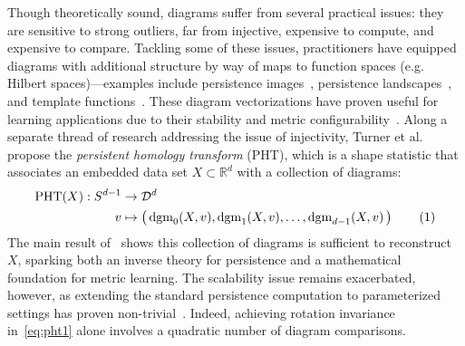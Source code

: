 \documentclass[10pt]{article}
\numberwithin{equation}{section}
\newcommand{\+}{%
	\raisebox{0.18ex}{\scaleobj{0.55}{+}}
}
\theoremstyle{definition}
\theoremstyle{definition}
\newcommand\numberthis{\addtocounter{equation}{1}\tag{\theequation}}
\begin{document}
Though theoretically sound, diagrams suffer from several practical issues: they are sensitive to strong outliers, far from injective, expensive to compute, and expensive to compare. 
Tackling some of these issues, practitioners have equipped diagrams with additional structure by way of maps to function spaces (e.g. Hilbert spaces)---examples include persistence images~\cite{}, persistence landscapes~\cite{}, and template functions~\cite{}. 
These diagram vectorizations have proven useful for learning applications due to their stability and  metric configurability~\cite{}.
Along a separate thread of research addressing the issue of injectivity, Turner et al. propose the \emph{persistent homology transform} (PHT), which is a shape statistic that associates an embedded data set $X \subset \mathbb{R}^d$ with a collection of diagrams: 
\begin{align*}\label{eq:pht1}
	\mathrm{PHT}(X): S^{d-1} &\to \mathcal{D}^d \\
	v &\mapsto \left( \, \mathrm{dgm}_0(X, v), \mathrm{dgm}_1(X, v), \dots, \mathrm{dgm}_{d-1}(X, v) \, \right) \numberthis
\end{align*}
The main result of~\cite{} shows this collection of diagrams is sufficient to reconstruct $X$, sparking both an inverse theory for persistence and a mathematical foundation for metric learning.  
The scalability issue remains exacerbated, however, as extending the standard persistence computation to parameterized settings has proven non-trivial~\cite{}. %
Indeed, achieving rotation invariance in~\eqref{eq:pht1} alone involves a quadratic number of diagram comparisons. 
 
\end{document}
